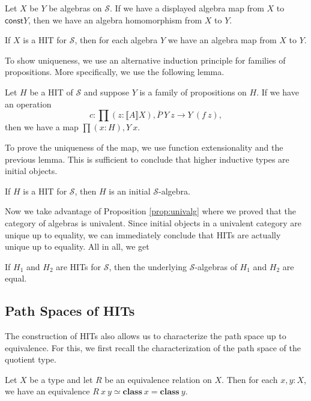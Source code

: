\documentclass[9pt]{entcs}
\newcommand{\constructor}[1]{\mathbf{#1}}
\newcommand{\function}[1]{\mathsf{#1}}
\newcommand{\deprod}[3]{\prod(#1 : #2), #3} %
\newcommand{\0}{\textbf{0}} %
\newcommand{\1}{\textbf{1}} %
\newcommand{\weq}{\simeq} %
\newcommand{\classof}{\constructor{class}} %
\newcommand{\sig}{\mathcal{S}} %
\newcommand{\semP}[1]{\llbracket #1 \rrbracket} %
\newcommand{\polydact}[2]{\overline{#1} \> #2} %
\newcommand{\constdisp}{\function{const}} %
\begin{document}
\begin{lemma}
Let $X$ be $Y$ be algebras on $\sig$.
If we have a displayed algebra map from $X$ to $\constdisp{Y}$, then we have an algebra homomorphism from $X$ to $Y$.
\end{lemma}

\begin{corollary}
If $X$ is a HIT for $\sig$, then for each algebra $Y$ we have an algebra map from $X$ to $Y$.
\end{corollary}

To show uniqueness, we use an alternative induction principle for families of propositions.
More specifically, we use the following lemma.

\begin{lemma}
Let $H$ be a HIT of $\sig$ and suppose $Y$ is a family of propositions on $H$.
If we have an operation
\[
c : \deprod{z}{\semP{A}{X}}{\polydact{P}{Y} \> z \rightarrow Y \> (f \> z)},
\]
then we have a map $\deprod{x}{H}{Y \> x}$.
\end{lemma}

To prove the uniqueness of the map, we use function extensionality and the previous lemma.
This is sufficient to conclude that higher inductive types are initial objects.

\begin{proposition}
If $H$ is a HIT for $\sig$, then $H$ is an initial $\sig$-algebra.
\end{proposition}

Now we take advantage of Proposition \ref{prop:univalg} where we proved that the category of algebras is univalent.
Since initial objects in a univalent category are unique up to equality, we can immediately conclude that HITs are actually unique up to equality.
All in all, we get

\begin{corollary}
\label{cor:hit_unique}
If $H_1$ and $H_2$ are HITs for $\sig$, then the underlying $\sig$-algebras of $H_1$ and $H_2$ are equal.
\end{corollary}

\subsection{Path Spaces of HITs}
The construction of HITs also allows us to characterize the path space up to equivalence.
For this, we first recall the characterization of the path space of the quotient type.

\begin{proposition}
Let $X$ be a type and let $R$ be an equivalence relation on $X$.
Then for each $x, y : X$, we have an equivalence $R \> x \> y \weq \classof \> x = \classof \> y$.
\end{proposition}
\end{document}
